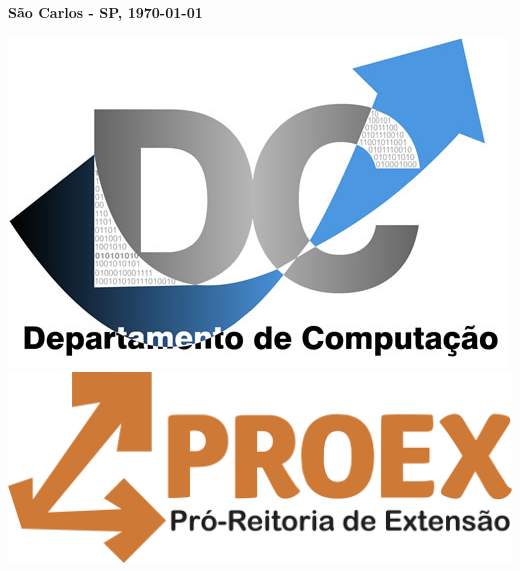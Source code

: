 \begin{center}
\vspace*{10ex}

\textbf{\large São Carlos - SP, \today}

\vspace*{5ex}

\includegraphics[width=.25\textwidth]{../figuras/LogoDC} \hfill
\includegraphics[width=.25\textwidth]{../figuras/LogoProEx}

\end{center} 